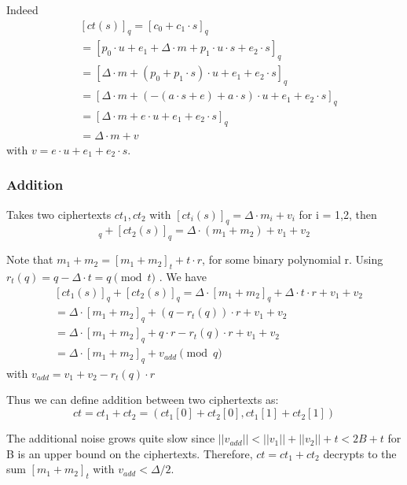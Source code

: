 \documentclass[A4paper,12pt]{article}
\begin{document}
Indeed
\begin{equation*}
\begin{aligned}
&[ct(s)]_q = [c_0 + c_1  \cdot s]_q \\
&= [p_0 \cdot u + e_1 + \Delta \cdot m + p_1 \cdot u \cdot s + e_2 \cdot s]_q \\
&= [\Delta \cdot m + (p_0 + p_1 \cdot s) \cdot u + e_1 + e_2 \cdot s]_q \\
&= [\Delta \cdot m + (-(a \cdot s + e) + a \cdot s) \cdot u + e_1 + e_2 \cdot s]_q \\
&= [\Delta \cdot m + e \cdot u + e_1 + e_2 \cdot s]_q \\
&= \Delta \cdot m + v
\end{aligned}
\end{equation*}
with $v = e \cdot u + e_1 + e_2 \cdot s $.
	\subsubsection{Addition}

Takes two ciphertexts $ct_1, ct_2$ with $[ct_i(s)]_q = \Delta \cdot m_i + v_i$ for i = 1,2, then 
\begin{equation*}
[ct_1(s)]_q + [ct_2(s)]_q = \Delta \cdot (m_1 + m_2) + v_1 + v_2 
\end{equation*}	

Note that $m_1 + m_2 = [m_1 + m_2]_t + t \cdot r$, for some binary polynomial r. Using $r_t(q) = q - \Delta \cdot t = q \pmod t$ . 
We have
\begin{equation*}
\begin{aligned}
	&[ct_1(s)]_q + [ct_2(s)]_q = \Delta \cdot [m_1 + m_2]_q + \Delta \cdot t \cdot r + v_1 + v_2\\
	&= \Delta \cdot [m_1 + m_2]_q + (q - r_t(q)) \cdot r + v_1 + v_2\\
	&= \Delta \cdot [m_1 + m_2]_q + q \cdot r - r_t(q) \cdot r + v_1 + v_2\\
	&= \Delta \cdot [m_1 + m_2]_q + v_{add} \pmod q
\end{aligned}
\end{equation*}
with $v_{add} = v_1 + v_2 - r_t(q) \cdot r$

Thus we can define addition between two ciphertexts as:
\begin{equation*}
ct = ct_1 + ct_2 = (ct_1[0] + ct_2[0], ct_1[1] + ct_2[1])
\end{equation*}

The additional noise grows quite slow since $||v_{add}|| < ||v_1|| + ||v_2|| + t < 2B + t$ for B is an upper bound on the ciphertexts. Therefore, 	$ct = ct_1 + ct_2$ decrypts to the sum $[m_1 + m_2]_t$ with $v_{add} < \Delta / 2$. 
\end{document}
